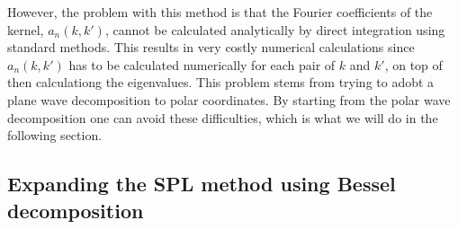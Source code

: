 \documentclass[11pt,a4paper, 
swedish,english %
]{article}
\begin{document}
However, the problem with this method is that the Fourier coefficients
of the kernel, $a_n(k, k')$, cannot be calculated analytically by
direct integration using standard methods. This results in very costly
numerical calculations since $a_n(k, k')$ has to be calculated
numerically for each pair of $k$ and $k'$, on top of then calculationg
the eigenvalues. 
This problem stems from trying to adobt a plane wave decomposition to
polar coordinates. By starting from the polar wave decomposition one
can avoid these difficulties, which is what we will do in the
following section. 

\subsection{Expanding the SPL method using Bessel decomposition}
\end{document}
